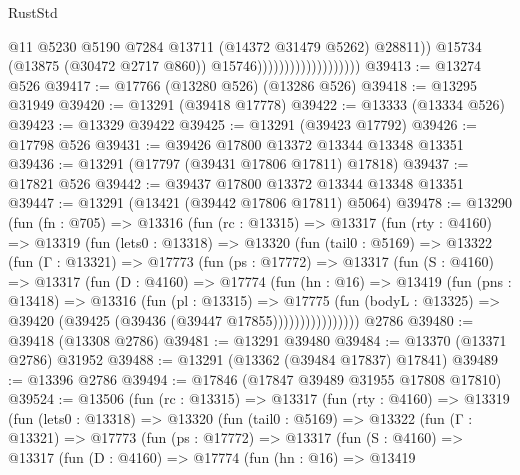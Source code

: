 \begin{lexlean}{RustStd}
\begin{coremodule}
                                              @11
                                              @5230
                                              @5190
                                              @7284
                                              @13711
                                              (@14372 @31479 @5262)
                                              @28811))
                                          @15734
                                          (@13875 (@30472 @2717 @860))
                                          @15746)))))))))))))))))))
@39413 := @13274 @526
@39417 := @17766 (@13280 @526) (@13286 @526)
@39418 := @13295 @31949
@39420 := @13291 (@39418 @17778)
@39422 := @13333 (@13334 @526)
@39423 := @13329 @39422
@39425 := @13291 (@39423 @17792)
@39426 := @17798 @526
@39431 := @39426 @17800 @13372 @13344 @13348 @13351
@39436 := @13291 (@17797 (@39431 @17806 @17811) @17818)
@39437 := @17821 @526
@39442 := @39437 @17800 @13372 @13344 @13348 @13351
@39447 := @13291 (@13421 (@39442 @17806 @17811) @5064)
@39478 := @13290
    (fun (fn : @705) =>
    @13316
      (fun (rc : @13315) =>
      @13317
        (fun (rty : @4160) =>
        @13319
          (fun (lets0 : @13318) =>
          @13320
            (fun (tail0 : @5169) =>
            @13322
              (fun (Γ : @13321) =>
              @17773
                (fun (ps : @17772) =>
                @13317
                  (fun (S : @4160) =>
                  @13317
                    (fun (D : @4160) =>
                    @17774
                      (fun (hn : @16) =>
                      @13419
                        (fun (pns : @13418) =>
                        @13316
                          (fun (pl : @13315) =>
                          @17775
                            (fun (bodyL : @13325) =>
                            @39420 (@39425 (@39436 (@39447 @17855))))))))))))))))
    @2786
@39480 := @39418 (@13308 @2786)
@39481 := @13291 @39480
@39484 := @13370 (@13371 @2786) @31952
@39488 := @13291 (@13362 (@39484 @17837) @17841)
@39489 := @13396 @2786
@39494 := @17846 (@17847 @39489 @31955 @17808 @17810)
@39524 := @13506
    (fun (rc : @13315) =>
    @13317
      (fun (rty : @4160) =>
      @13319
        (fun (lets0 : @13318) =>
        @13320
          (fun (tail0 : @5169) =>
          @13322
            (fun (Γ : @13321) =>
            @17773
              (fun (ps : @17772) =>
              @13317
                (fun (S : @4160) =>
                @13317
                  (fun (D : @4160) =>
                  @17774
                    (fun (hn : @16) =>
                    @13419

\end{coremodule}
\end{lexlean}
